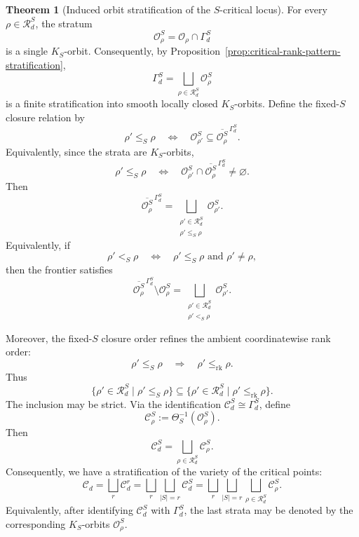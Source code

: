 \documentclass[11pt]{article}
\theoremstyle{definition}
\newtheorem{theorem}{Theorem}[section]
\begin{document}
\begin{theorem}[Induced orbit stratification of the \(S\)-critical locus]
\label{prop:critical-rank-pattern-decomposition}
For every \(\rho\in\mathcal R_d^S\), the stratum
\[
\mathcal O_\rho^S
=
\mathcal O_\rho\cap\Gamma_d^S
\]
is a single \(K_S\)-orbit. Consequently, by Proposition~\ref{prop:critical-rank-pattern-stratification},
\[
\Gamma_d^S
=
\bigsqcup_{\rho\in\mathcal R_d^S}\mathcal O_\rho^S
\]
is a finite stratification into smooth locally closed \(K_S\)-orbits. Define the fixed-\(S\) closure relation by
\[
\rho'\leq_S\rho
\quad\Longleftrightarrow\quad
\mathcal O_{\rho'}^S
\subseteq
\overline{\mathcal O_\rho^S}^{\,\Gamma_d^S}.
\]
Equivalently, since the strata are \(K_S\)-orbits,
\[
\rho'\leq_S\rho
\quad\Longleftrightarrow\quad
\mathcal O_{\rho'}^S
\cap
\overline{\mathcal O_\rho^S}^{\,\Gamma_d^S}
\neq\varnothing.
\]
Then
\[
\overline{\mathcal O_\rho^S}^{\,\Gamma_d^S}
=
\bigsqcup_{\substack{\rho'\in\mathcal R_d^S\\
\rho'\leq_S\rho}}
\mathcal O_{\rho'}^S.
\]
Equivalently, if
\[
\rho'<_S\rho
\quad\Longleftrightarrow\quad
\rho'\leq_S\rho
\text{ and }
\rho'\neq \rho,
\]
then the frontier satisfies
\[
\overline{\mathcal O_\rho^S}^{\,\Gamma_d^S}
\setminus
\mathcal O_\rho^S
=
\bigsqcup_{\substack{\rho'\in\mathcal R_d^S\\
\rho'<_S\rho}}
\mathcal O_{\rho'}^S.
\]

Moreover, the fixed-\(S\) closure order refines the ambient coordinatewise rank
order:
\[
\rho'\leq_S\rho
\quad\Longrightarrow\quad
\rho'\leq_{\mathrm{rk}}\rho.
\]
Thus
\[
\{\rho'\in\mathcal R_d^S\mid \rho'\leq_S\rho\}
\subseteq
\{\rho'\in\mathcal R_d^S\mid \rho'\leq_{\mathrm{rk}}\rho\}.
\]
The inclusion may be strict. Via the identification \(\mathcal C_d^S\cong\Gamma_d^S\), define
\[
\mathcal C_\rho^S
:=
\Theta_S^{-1}(\mathcal O_\rho^S).
\]
Then
\[
\mathcal C_d^S
=
\bigsqcup_{\rho\in\mathcal R_d^S}\mathcal C_\rho^S.
\]
Consequently, we have a stratification of the variety of the critical points:
\[
\mathcal C_d
=
\bigsqcup_r \mathcal C_d^r
=
\bigsqcup_r \bigsqcup_{|S|=r}\mathcal C_d^S
=
\bigsqcup_r \bigsqcup_{|S|=r}
\bigsqcup_{\rho\in\mathcal R_d^S}
\mathcal C_\rho^S.
\]
Equivalently, after identifying \(\mathcal C_d^S\) with \(\Gamma_d^S\), the last
strata may be denoted by the corresponding \(K_S\)-orbits
\(\mathcal O_\rho^S\).
\end{theorem}
\end{document}
